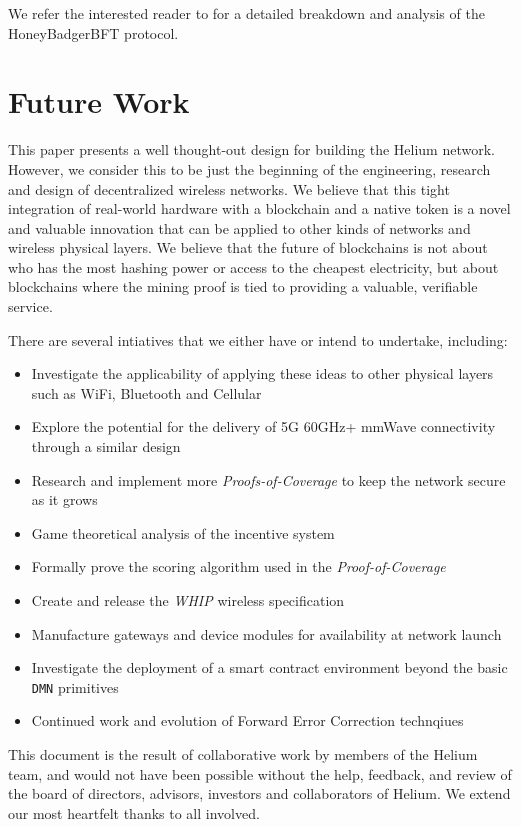 \documentclass[10pt, nonatbib, nocopyrightspace, reprint]{sigplanconf}
\begin{document}
We refer the interested reader to \cite{honeybadger} for a detailed breakdown and analysis of the HoneyBadgerBFT protocol.

\section{Future Work}

This paper presents a well thought-out design for building the Helium network. However, we consider this to be just the beginning of the engineering, research and design of decentralized wireless networks. We believe that this tight integration of real-world hardware with a blockchain and a native token is a novel and valuable innovation that can be applied to other kinds of networks and wireless physical layers. We believe that the future of blockchains is not about who has the most hashing power or access to the cheapest electricity, but about blockchains where the mining proof is tied to providing a valuable, verifiable service.

There are several intiatives that we either have or intend to undertake, including:

\begin{itemize}
    \item Investigate the applicability of applying these ideas to other physical layers such as WiFi, Bluetooth and Cellular
    \item Explore the potential for the delivery of 5G 60GHz+ mmWave connectivity through a similar design
    \item Research and implement more \emph{Proofs-of-Coverage} to keep the network secure as it grows
    \item Game theoretical analysis of the incentive system
    \item Formally prove the scoring algorithm used in the \emph{Proof-of-Coverage}
    \item Create and release the \emph{WHIP} wireless specification
    \item Manufacture gateways and device modules for availability at network launch
    \item Investigate the deployment of a smart contract environment beyond the basic \verb|DMN| primitives
    \item Continued work and evolution of Forward Error Correction technqiues
\end{itemize}

\acks

This document is the result of collaborative work by members of the Helium team, and would not have been possible without the help, feedback, and review of the board of directors, advisors, investors and collaborators of Helium. We extend our most heartfelt thanks to all involved.
\end{document}
